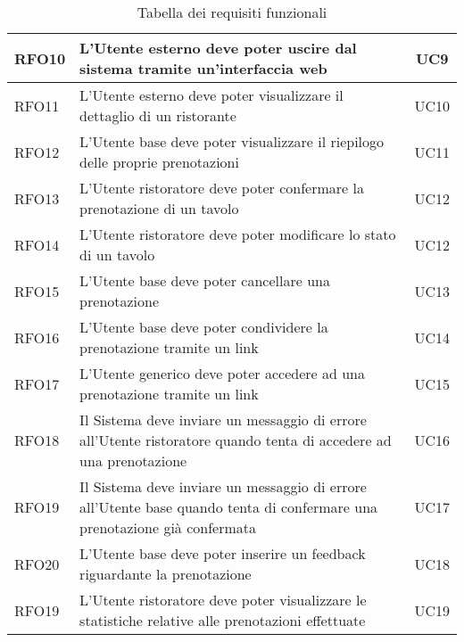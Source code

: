 \begin{table}[h]
\begin{tabularx}{\textwidth}{l|X|c}
		\hline
		RFO10       & L'Utente esterno deve poter uscire dal sistema tramite un'interfaccia web                                                 & UC9            \\
		\hline
		RFO11       & L'Utente esterno deve poter visualizzare il dettaglio di un ristorante                                                    & UC10           \\
		\hline
		RFO12       & L'Utente base deve poter visualizzare il riepilogo delle proprie prenotazioni                                             & UC11           \\
		\hline
		RFO13       & L'Utente ristoratore deve poter confermare la prenotazione di un tavolo                                                   & UC12           \\
		\hline
		RFO14       & L'Utente ristoratore deve poter modificare lo stato di un tavolo                                                          & UC12           \\
		\hline
		RFO15       & L'Utente base deve poter cancellare una prenotazione                                                                      & UC13           \\
		\hline
		RFO16       & L'Utente base deve poter condividere la prenotazione tramite un link                                                      & UC14           \\
		\hline
		RFO17       & L'Utente generico deve poter accedere ad una prenotazione tramite un link                                                 & UC15           \\
		\hline
		RFO18       & Il Sistema deve inviare un messaggio di errore all'Utente ristoratore quando tenta di accedere ad una prenotazione        & UC16           \\
		\hline
		RFO19       & Il Sistema deve inviare un messaggio di errore all'Utente base quando tenta di confermare una prenotazione già confermata & UC17           \\
		\hline
		RFO20       & L'Utente base deve poter inserire un feedback riguardante la prenotazione                                                 & UC18           \\
		\hline
		RFO19       & L'Utente ristoratore deve poter visualizzare le statistiche relative alle prenotazioni effettuate                         & UC19           \\
		\hline
	\end{tabularx}
	\caption{Tabella dei requisiti funzionali}
\end{table}

